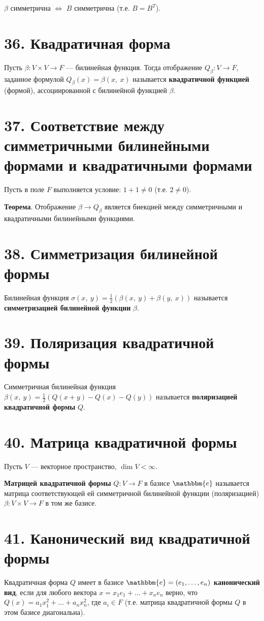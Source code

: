 \documentclass[a4paper, 12pt]{article}
\newcommand{\me}{\mathbbm{e}}
\begin{document}
$\beta$ симметрична $\Longleftrightarrow$ $B$ симметрична (т.е. $B = B^T$).

\section*{36. Квадратичная форма}
Пусть $\beta: V \times V \rightarrow F$ --- билинейная функция. Тогда отображение  $Q_\beta: V \rightarrow F$, заданное формулой $Q_\beta(x) = \beta(x,\ x)$ называется \textbf{квадратичной функцией} (формой), ассоциированной с билинейной функцией $\beta$.

\section*{37. Соответствие между симметричными билинейными формами и квадратичными формами}
Пусть в поле $F$ выполняется условие: $1 + 1 \neq 0$ (т.е. $2 \neq 0$).

\textbf{Теорема}. Отображение $\beta \rightarrow Q_\beta$ является биекцией между симметричными и квадратичными билинейными функциями.

\section*{38. Симметризация билинейной формы}
Билинейная функция $\sigma(x,\ y) = \frac{1}{2}(\beta(x,\ y) + \beta(y,\ x))$ называется \textbf{симметризацией билинейной функции} $\beta$.

\section*{39. Поляризация квадратичной формы}
Симметричная билинейная функция $\beta(x,\ y) = \frac{1}{2}(Q(x + y) - Q(x) - Q(y))$ называется \textbf{поляризацией квадратичной формы} $Q$.

\section*{40. Матрица квадратичной формы}
Пусть $V$ --- векторное пространство, $\dim V < \infty$.

\textbf{Матрицей квадратичной формы} $Q: V\rightarrow F$ в базисе $\me$ называется матрица соответствующей ей симметричной билинейной функции (поляризацией) $\beta: V\times V \rightarrow F$ в том же базисе.

\section*{41. Канонический вид квадратичной формы}
Квадратичная форма $Q$ имеет в базисе $\me = (e_1, \ldots, e_n)$ \textbf{канонический вид}, если для любого вектора $x = x_1e_1 + \ldots + x_ne_n$ верно, что $Q(x) = a_1x_1^2 + \ldots + a_nx_n^2$, где $a_i \in F$ (т.е. матрица квадратичной формы $Q$ в этом базисе диагональна).
\end{document}
